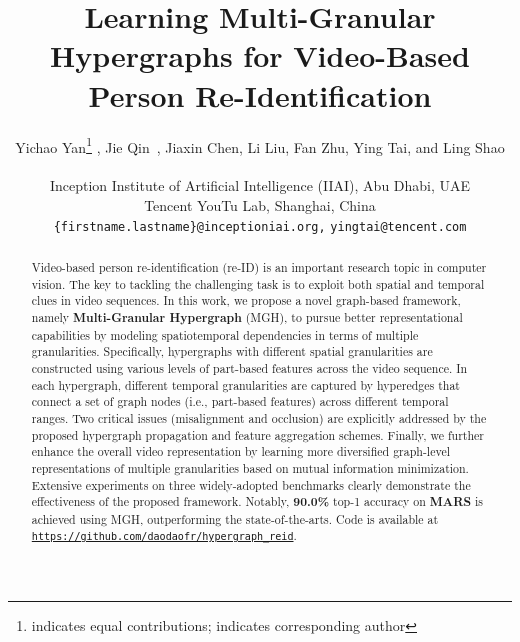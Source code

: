 \documentclass[10pt,twocolumn,letterpaper]{article}
\begin{document}
\title{Learning Multi-Granular Hypergraphs for Video-Based Person Re-Identification}

\author{Yichao Yan\thanks{indicates equal contributions;  indicates corresponding author} ,
Jie Qin\footnotemark[1]\, ,
Jiaxin Chen,
Li Liu,
Fan Zhu,
Ying Tai,
and Ling Shao
\\
\noindent

Inception Institute of Artificial Intelligence (IIAI), Abu Dhabi, UAE \qquad \\
 Tencent YouTu Lab, Shanghai, China \qquad 
\\
 {\tt\small \{firstname.lastname\}@inceptioniai.org,} \tt\small yingtai@tencent.com\\
}

\maketitle
\thispagestyle{empty}

\begin{abstract}
   Video-based person re-identification (re-ID) is an important research topic in computer vision. The key to tackling the challenging task is to exploit both spatial and temporal clues in video sequences. In this work, we propose a novel graph-based framework, namely \textbf{Multi-Granular Hypergraph} (MGH), to pursue better representational capabilities by modeling spatiotemporal dependencies in terms of multiple granularities. Specifically, hypergraphs with different spatial granularities are constructed using various levels of part-based features across the video sequence. In each hypergraph, different temporal granularities are captured by hyperedges that connect a set of graph nodes (i.e., part-based features) across different temporal ranges. Two critical issues (misalignment and occlusion) are explicitly addressed by the proposed hypergraph propagation and feature aggregation schemes. Finally, we further enhance the overall video representation by learning more diversified graph-level representations of multiple granularities based on mutual information minimization. Extensive experiments on three widely-adopted benchmarks clearly demonstrate the effectiveness of the proposed framework. Notably, \textbf{90.0\%} top-1 accuracy on \textbf{MARS} is achieved using MGH, outperforming the state-of-the-arts. Code is available at {\tt\small \url{https://github.com/daodaofr/hypergraph_reid}}.
\end{abstract}
\end{document}
